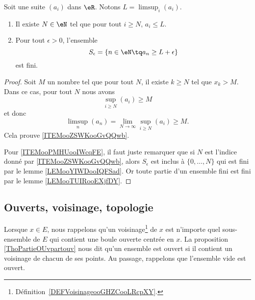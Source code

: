 \begin{lemma}       \label{LEMooHGJVooCbgOEK}
    Soit une suite \( (a_i)\) dans \( \eR\). Notons \( L= \limsup_i(a_i)\).
    \begin{enumerate}
        \item       \label{ITEMooZSWKooGvQQwb}
    Il existe \( N\in \eN\) tel que pour tout \( i\geq N\), \( a_i\leq L\).
\item       \label{ITEMooPMHUooIWcqFE}
    Pour tout \( \epsilon>0\), l'ensemble
    \begin{equation}
        S_{\epsilon}=\{ n\in \eN\tq a_n\geq L+\epsilon \}
    \end{equation}
    est fini.
    \end{enumerate}
\end{lemma}

\begin{proof}
    Soit \( M\) un nombre tel que pour tout \( N\), il existe \( k\geq N\) tel que \( x_k>M\). Dans ce cas, pour tout \( N\) nous avons
    \begin{equation}
        \sup_{i\geq N}(a_i)\geq M
    \end{equation}
    et donc
    \begin{equation}
        \limsup_n(a_n)=\lim_{N\to \infty}\sup_{i\geq N}(a_i)\geq M.
    \end{equation}
    Cela prouve \ref{ITEMooZSWKooGvQQwb}.

    Pour \ref{ITEMooPMHUooIWcqFE}, il faut juste remarquer que si \( N\) est l'indice donné par \ref{ITEMooZSWKooGvQQwb}, alors \( S_{\epsilon}\) est inclus à \( \{ 0,\ldots, N \}\) qui est fini par le lemme \ref{LEMooYIWDooIQFSad}. Or toute partie d'un ensemble fini est fini par le lemme \ref{LEMooTUIRooEXjfDY}.
\end{proof}

\subsection{Ouverts, voisinage, topologie}

Lorsque $x\in E$, nous rappelons qu'un voisinage\footnote{Définition~\ref{DEFVoisinageooGHZCooLRcpXY}.} de $x$ est n'importe quel sous-ensemble de $E$ qui contient une boule ouverte centrée en $x$. La proposition \ref{ThoPartieOUvpartouv} nous dit qu'un ensemble est ouvert si il contient un voisinage de chacun de ses points. Au passage, rappelons que l'ensemble vide est ouvert.


